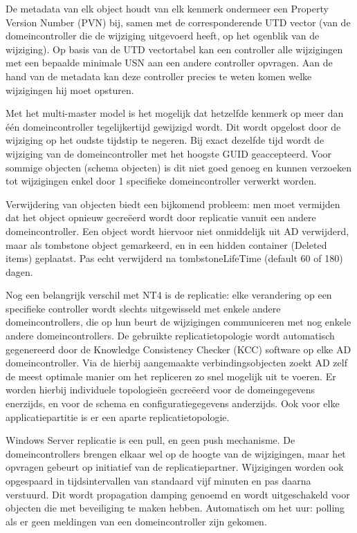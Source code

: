 De metadata van elk object houdt van elk kenmerk ondermeer een Property Version
Number (PVN) bij, samen met de corresponderende UTD vector (van de
domeincontroller die de wijziging uitgevoerd heeft, op het ogenblik van de
wijziging). Op basis van de UTD vectortabel kan een controller alle wijzigingen
met een bepaalde minimale USN aan een andere controller opvragen. Aan de hand
van de metadata kan deze controller precies te weten komen welke wijzigingen hij
moet opsturen.

Met het multi-master model is het mogelijk dat hetzelfde kenmerk op meer dan één
domeincontroller tegelijkertijd gewijzigd wordt. Dit wordt opgelost door de
wijziging op het oudste tijdstip te negeren. Bij exact dezelfde tijd wordt de
wijziging van de domeincontroller met het hoogste GUID geaccepteerd. Voor
sommige objecten (schema objecten) is dit niet goed genoeg en kunnen verzoeken
tot wijzigingen enkel door 1 specifieke domeincontroller verwerkt worden.

Verwijdering van objecten biedt een bijkomend probleem: men moet vermijden dat
het object opnieuw gecreëerd wordt door replicatie vanuit een andere
domeincontroller. Een object wordt hiervoor niet onmiddelijk uit AD verwijderd,
maar als tombstone object gemarkeerd, en in een hidden container (Deleted items)
geplaatst. Pas echt verwijderd na tombstoneLifeTime (default 60 of 180) dagen.

Nog een belangrijk verschil met NT4 is de  replicatie:
elke verandering op een specifieke controller wordt slechts uitgewisseld met
enkele andere domeincontrollers, die op hun beurt de wijzigingen communiceren
met nog enkele andere domeincontrollers. De gebruikte replicatietopologie wordt
automatisch gegenereerd door de Knowledge Consistency Checker (KCC) software op
elke AD domeincontroller. Via de hierbij aangemaakte verbindingsobjecten zoekt
AD zelf de meest optimale manier om het repliceren zo snel mogelijk uit te
voeren. Er worden hierbij individuele topologieën gecreëerd voor de
domeingegevens enerzijds, en voor de schema en configuratiegegevens anderzijds.
Ook voor elke applicatiepartitie is er een aparte replicatietopologie.

Windows Server replicatie is een pull, en geen push mechanisme. De
domeincontrollers brengen elkaar wel op de hoogte van de wijzigingen, maar het
opvragen gebeurt op initiatief van de replicatiepartner. Wijzigingen worden ook
opgespaard in tijdsintervallen van standaard vijf minuten en pas daarna
verstuurd. Dit wordt propagation damping genoemd en wordt uitgeschakeld voor
objecten die met beveiliging te maken hebben. Automatisch om het uur: polling als
er geen meldingen van een domeincontroller zijn gekomen.

